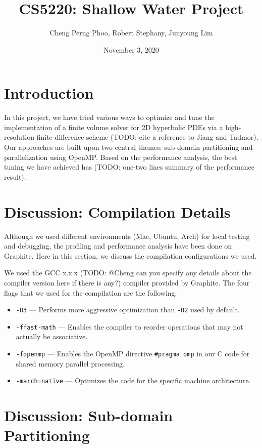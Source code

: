 \documentclass{article}
\title{CS5220: Shallow Water Project}
\author{Cheng Perng Phoo, Robert Stephany, Junyoung Lim}
\date{November 3, 2020}
\begin{document}
\maketitle

\section{Introduction}

In this project, we have tried various ways to optimize and tune the implementation of a finite volume solver for 2D hyperbolic PDEs via a high-resolution finite difference scheme (TODO: cite a reference to Jiang and Tadmor). Our approaches are built upon two central themes: sub-domain partitioning and parallelization using OpenMP. Based on the performance analysis, the best tuning we have achieved has (TODO: one-two lines summary of the performance result).

\section{Discussion: Compilation Details}

Although we used different environments (Mac, Ubuntu, Arch) for local testing and debugging, the profiling and performance analysis have been done on Graphite. Here in this section, we discuss the compilation configurations we used.

We used the GCC x.x.x (TODO: @Cheng can you specify any details about the compiler version here if there is any?) compiler provided by Graphite. The four flags that we used for the compilation are the following:
\begin{itemize}
	\item \texttt{-O3} --- Performs more aggressive optimization than \texttt{-O2} used by default.
	\item \texttt{-ffast-math} --- Enables the compiler to reorder operations that may not actually be associative.
	\item \texttt{-fopenmp} --- Enables the OpenMP directive \texttt{\#pragma omp} in our C code for shared memory parallel processing.
	\item \texttt{-march=native} --- Optimizes the code for the specific machine architecture.
\end{itemize}

\section{Discussion: Sub-domain Partitioning}
\end{document}
